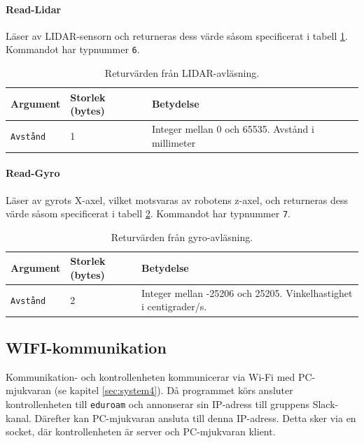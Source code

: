 \documentclass[a4paper,11pt]{article}
\begin{document}
\paragraph{Read-Lidar}
Läser av LIDAR-sensorn och returneras dess värde såsom specificerat i tabell \ref{tab:lidar}. Kommandot har typnummer \texttt{6}.
\begin{table}[h!]
    \centering
    \begin{tabular}{|l|l|l|}
    \rowcolor{gray!50}
        \hline
        \textbf{Argument} & \textbf{Storlek (bytes)} & \textbf{Betydelse} \\ \hline
        \texttt{Avstånd} & 1 & Integer mellan 0 och 65535. Avstånd i millimeter \\ \hline
        \end{tabular}
    \caption{Returvärden från LIDAR-avläsning.}
    \label{tab:lidar}
\end{table}


\paragraph{Read-Gyro}
Läser av gyrots X-axel, vilket motsvaras av robotens z-axel, och returneras dess värde såsom specificerat i tabell \ref{tab:gyro}. Kommandot har typnummer \texttt{7}.
\begin{table}[h!]
    \centering
    \begin{tabular}{|l|l|l|}
    \rowcolor{gray!50}
        \hline
        \textbf{Argument} & \textbf{Storlek (bytes)} & \textbf{Betydelse} \\ \hline
        \texttt{Avstånd} & 2 & Integer mellan -25206 och 25205. Vinkelhastighet i centigrader/s. \\ \hline
    \end{tabular}
    \caption{Returvärden från gyro-avläsning.}
    \label{tab:gyro}
\end{table}

\subsection{WIFI-kommunikation}
\label{ssec:wifi}
Kommunikation- och kontrollenheten kommunicerar via Wi-Fi med PC-mjukvaran (se kapitel \ref{sec:system4}). Då programmet körs ansluter kontrollenheten till \texttt{eduroam} och annonserar sin IP-adress till gruppens Slack-kanal. Därefter kan PC-mjukvaran ansluta till denna IP-adress. Detta sker via en socket, där kontrollenheten är server och PC-mjukvaran klient.
\end{document}
